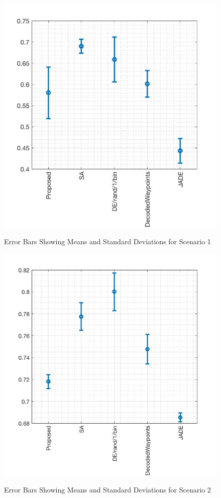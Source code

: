 \documentclass[10pt,a4paper, oneside, conference]{IEEEtran}
\begin{document}
\begin{figure}[t]
	\caption{Error Bars Showing Means and Standard Deviations for Scenario 1}
	\includegraphics[width=0.8\linewidth]{scenario1Means.jpg}
	\centering
	\label{fig:scenario1Means}	
	\end{figure}
	
\begin{figure}[t]
	\caption{Error Bars Showing Means and Standard Deviations for Scenario 2}
	\centering
	\includegraphics[width=0.8\linewidth]{scenario2Means.jpg}
	\label{fig:scenario2Means}	
	\end{figure}
	
\end{document}
